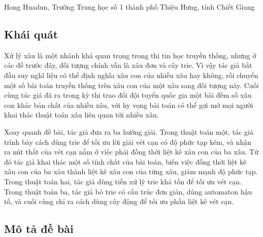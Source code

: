 \documentclass[11pt]{article}
\begin{document}
\begin{center}
Hong Huadun, Trường Trung học số 1 thành phố Thiệu Hưng, tỉnh Chiết Giang
\end{center}

\renewcommand{\abstractname}{Tóm tắt}
\begin{abstract}
Xử lý xâu là một chủ đề kinh điển trong thi tin học, và đã có rất nhiều thuật
toán kinh điển cho chủ đề này. Tuy nhiên, trong các cuộc thi trước đây, đối
tượng của phần lớn bài toán thường là một xâu đơn, hoặc cây trie tạo bởi nhiều
xâu, còn câu hỏi cũng phần lớn liên quan tới xâu con. Vì vậy tác giả thử suy
nghĩ theo hướng xâu con của nhiều xâu, và ra một bài liên quan trong kỳ thi
trao đổi của đội tuyển quốc gia. Hy vọng bài toán này có thể gợi mở thêm, thu
hút mọi người khai thác các thuật toán xâu liên quan tới nhiều xâu.
\end{abstract}

\subsection{Khái quát}

Xử lý xâu là một nhánh khá quan trọng trong thi tin học truyền thống, nhưng ở
các đề trước đây, đối tượng chính vẫn là xâu đơn và cây trie. Vì vậy tác giả
bắt đầu suy nghĩ liệu có thể định nghĩa xâu con của nhiều xâu hay không, rồi
chuyển một số bài toán truyền thống trên xâu con của một xâu sang đối tượng
này. Cuối cùng tác giả đã ra trong kỳ thi trao đổi đội tuyển quốc gia một bài
đếm số xâu con khác bản chất của nhiều xâu, với hy vọng bài toán có thể gợi mở
mọi người khai thác thuật toán xâu liên quan tới nhiều xâu.

Xoay quanh đề bài, tác giả đưa ra ba hướng giải. Trong thuật toán một, tác giả
trình bày cách dùng trie để tối ưu lời giải vét cạn có độ phức tạp kém, và
nhận ra nút thắt của vét cạn nằm ở việc phải đồng thời liệt kê xâu con của ba
xâu. Từ đó tác giả khai thác một số tính chất của bài toán, biến việc đồng
thời liệt kê xâu con của ba xâu thành liệt kê xâu con của từng xâu, giảm mạnh
độ phức tạp. Trong thuật toán hai, tác giả dùng tiền xử lý trie khả tồn để tối
ưu vét cạn. Trong thuật toán ba, tác giả bỏ trie có cấu trúc đơn giản, dùng
automaton hậu tố, và cuối cùng chỉ ra cách dùng cây động để tối ưu phần liệt
kê vét cạn.

\subsection{Mô tả đề bài}
\end{document}
